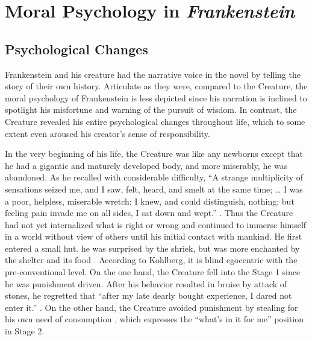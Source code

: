 \section{Moral Psychology in \textit{Frankenstein}} %
\label{sec:moral_psychology_in_frankenstein}
\subsection{Psychological Changes} %
\label{sub:psychological_changes}
\begin{text}

Frankenstein and his creature had the narrative voice in the novel by telling the story of their own history. Articulate as they were, compared to the Creature, the moral psychology of Frankenstein is less depicted since his narration is inclined to spotlight his misfortune and warning of the pursuit of wisdom. In contrast, the Creature revealed his entire psychological changes throughout life, which to some extent even aroused his creator's sense of responsibility.

In the very beginning of his life, the Creature was like any newborns except that he had a gigantic and maturely developed body, and more miserably, he was abandoned. As he recalled with considerable difficulty, ``A strange multiplicity of sensations seized me, and I saw, felt, heard, and smelt at the same time; \dots{} I was a poor, helpless, miserable wretch; I knew, and could distinguish, nothing; but feeling pain invade me on all sides, I sat down and wept.'' . Thus the Creature had not yet internalized what is right or wrong and continued to immerse himself in a world without view of others until his initial contact with mankind. He first entered a small hut. he was surprised by the shriek, but was more enchanted by the shelter and its food . According to Kohlberg, it is blind egocentric with the pre-conventional level. On the one hand, the Creature fell into the Stage 1 since he was punishment driven. After his behavior resulted in bruise by attack of stones, he regretted that ``after my late dearly bought experience, I dared not enter it.'' . On the other hand, the Creature avoided punishment by stealing for his own need of consumption , which expresses the ``what's in it for me'' position in Stage 2.


\end{text}
